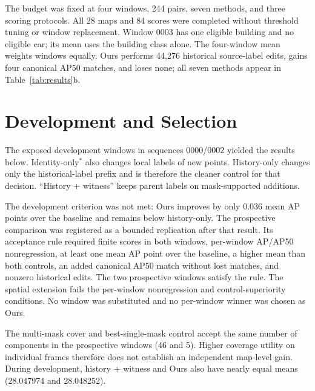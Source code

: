 The budget was fixed at four windows, 244 pairs, seven methods, and three scoring protocols. All 28 maps and 84 scores were completed without threshold tuning or window replacement. Window 0003 has one eligible building and no eligible car; its mean uses the building class alone. The four-window mean weights windows equally. Ours performs 44,276 historical source-label edits, gains four canonical AP50 matches, and loses none; all seven methods appear in Table~\ref{tab:results}b.

\section{Development and Selection}\label{app:development}
The exposed development windows in sequences 0000/0002 yielded the results below. Identity-only$^*$ also changes local labels of new points. History-only changes only the historical-label prefix and is therefore the cleaner control for that decision. ``History + witness'' keeps parent labels on mask-supported additions.

\begin{center}\small

\end{center}

The development criterion was not met: Ours improves by only 0.036 mean AP points over the baseline and remains below history-only. The prospective comparison was registered as a bounded replication after that result. Its acceptance rule required finite scores in both windows, per-window AP/AP50 nonregression, at least one mean AP point over the baseline, a higher mean than both controls, an added canonical AP50 match without lost matches, and nonzero historical edits. The two prospective windows satisfy the rule. The spatial extension fails the per-window nonregression and control-superiority conditions. No window was substituted and no per-window winner was chosen as Ours.

The multi-mask cover and best-single-mask control accept the same number of components in the prospective windows (46 and 5). Higher coverage utility on individual frames therefore does not establish an independent map-level gain. During development, history + witness and Ours also have nearly equal means (28.047974 and 28.048252).



